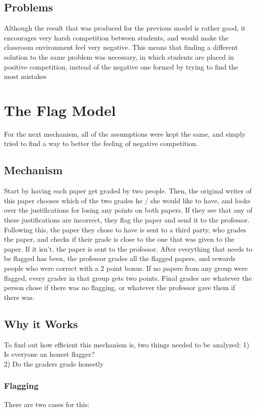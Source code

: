 \documentclass[12pt, Arial]{article}
\begin{document}
\subsection{Problems}
Although the result that was produced for the previous model is rather good, it encourages very harsh competition between students, and would make the classroom environment feel very negative. This means that finding a different solution to the same problem was necessary, in which students are placed in positive competition, instead of the negative one formed by trying to find the most mistakes

\section{The Flag Model}
For the next mechanism, all of the assumptions were kept the same, and simply tried to find a way to better the feeling of negative competition.
\subsection{Mechanism}
Start by having each paper get graded by two people. Then, the original writer of this paper chooses which of the two grades he / she would like to have, and looks over the justifications for losing any points on both papers. If they see that any of these justifications are incorrect, they flag the paper and send it to the professor. Following this, the paper they chose to have is sent to a third party, who grades the paper, and checks if their grade is close to the one that was given to the paper. If it isn't, the paper is sent to the professor. After everything that needs to be flagged has been, the professor grades all the flagged papers, and rewards people who were correct with a 2 point bonus. If no papers from any group were flagged, every grader in that group gets two points. Final grades are whatever the person chose if there was no flagging, or whatever the professor gave them if there was.
\subsection{Why it Works}
To find out how efficient this mechanism is, two things needed to be analyzed:
1) Is everyone an honest flagger?
$$$$
2) Do the graders grade honestly
\subsubsection{Flagging}
There are two cases for this:
\end{document}
